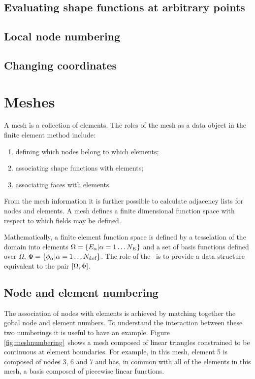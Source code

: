 \documentclass[a4paper, 11pt]{book}
\newcommand{\targetlabel}[1]{\hypertarget{#1}{}\label{#1}}
\begin{document}
\section{Evaluating shape functions at arbitrary points}

\section{Local node numbering}


\section{Changing coordinates}




\chapter{Meshes}\targetlabel{chap:meshes}

A mesh is a collection of elements. The roles of the mesh as a data object in
the finite element method include:
\begin{enumerate}
\item defining which nodes belong to which elements;
\item associating shape functions with elements;
\item associating faces with elements.
\end{enumerate}
From the mesh information it is further possible to calculate adjacency
lists for nodes and elements. A mesh defines a finite dimensional function
space with respect to which fields may be defined.

Mathematically, a finite element function space is defined by a tesselation
of the domain into elements $\Omega=\{E_\alpha|\alpha=1\ldots N_E\}$ and a set of basis
functions defined over $\Omega$, $\Phi=\{\phi_\alpha|\alpha=1\ldots N_\mathrm{dof}\}$. The role of
the \meshtype\ is to provide a data structure equivalent to the pair
$[\Omega,\Phi]$.

\section{Node and element numbering}

The association of nodes with elements is achieved by matching together the
gobal node and element numbers. To understand the interaction between these
two numberings it is useful to have an example. Figure \ref{fig:meshnumbering}\
shows a mesh composed of linear triangles constrained to be continuous at
element boundaries. For example, in this mesh, element 5 is composed of
nodes 3, 6 and 7 and has, in common with all of the elements in this mesh, a
basis composed of piecewise linear functions.
\end{document}
